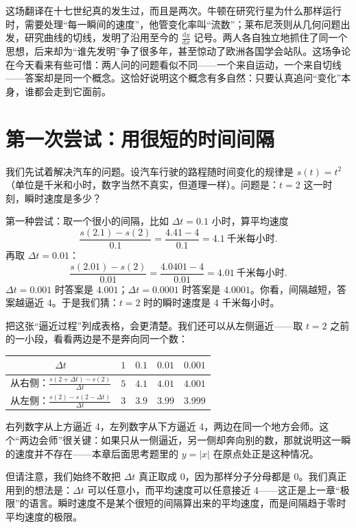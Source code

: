 这场翻译在十七世纪真的发生过，而且是两次。牛顿在研究行星为什么那样运行时，需要处理“每一瞬间的速度”，他管变化率叫“流数”；莱布尼茨则从几何问题出发，研究曲线的切线，发明了沿用至今的 $\frac{\mathrm{d}y}{\mathrm{d}x}$ 记号。两人各自独立地抓住了同一个思想，后来却为“谁先发明”争了很多年，甚至惊动了欧洲各国学会站队。这场争论在今天看来有些可惜：两人问的问题看似不同——一个来自运动，一个来自切线——答案却是同一个概念。这恰好说明这个概念有多自然：只要认真追问“变化”本身，谁都会走到它面前。

\section{第一次尝试：用很短的时间间隔}

我们先试着解决汽车的问题。设汽车行驶的路程随时间变化的规律是 $s(t)=t^2$（单位是千米和小时，数字当然不真实，但道理一样）。问题是：$t=2$ 这一时刻，瞬时速度是多少？

第一种尝试：取一个很小的间隔，比如 $\Delta t=0.1$ 小时，算平均速度
\[
\frac{s(2.1)-s(2)}{0.1}=\frac{4.41-4}{0.1}=4.1\ \text{千米每小时}.
\]
再取 $\Delta t=0.01$：
\[
\frac{s(2.01)-s(2)}{0.01}=\frac{4.0401-4}{0.01}=4.01\ \text{千米每小时}.
\]
$\Delta t=0.001$ 时答案是 $4.001$；$\Delta t=0.0001$ 时答案是 $4.0001$。你看，间隔越短，答案越逼近 4。于是我们猜：$t=2$ 时的瞬时速度是 4 千米每小时。

把这张“逼近过程”列成表格，会更清楚。我们还可以从左侧逼近——取 $t=2$ 之前的一小段，看看两边是不是奔向同一个数：

\begin{center}
\begin{tabular}{ccccc}
\toprule
$\Delta t$ & $1$ & $0.1$ & $0.01$ & $0.001$ \\
\midrule
从右侧：$\frac{s(2+\Delta t)-s(2)}{\Delta t}$ & $5$ & $4.1$ & $4.01$ & $4.001$ \\
从左侧：$\frac{s(2)-s(2-\Delta t)}{\Delta t}$ & $3$ & $3.9$ & $3.99$ & $3.999$ \\
\bottomrule
\end{tabular}
\end{center}

右列数字从上方逼近 4，左列数字从下方逼近 4，两边在同一个地方会师。这个“两边会师”很关键：如果只从一侧逼近，另一侧却奔向别的数，那就说明这一瞬的速度并不存在——本章后面思考题里的 $y=|x|$ 在原点处正是这种情况。

但请注意，我们始终不敢把 $\Delta t$ 真正取成 0，因为那样分子分母都是 0。我们真正用到的想法是：$\Delta t$ 可以任意小，而平均速度可以任意接近 4——这正是上一章“极限”的语言。瞬时速度不是某个很短的间隔算出来的平均速度，而是间隔趋于零时平均速度的极限。

